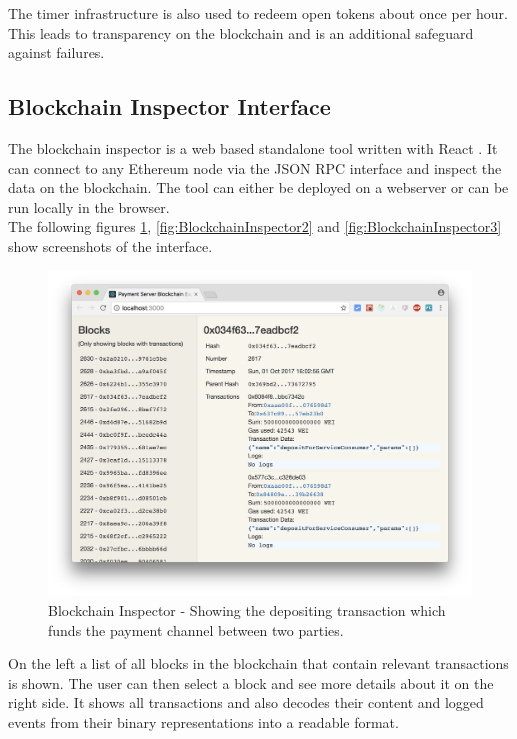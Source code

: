 \documentclass[a4paper,12pt]{scrartcl}
\begin{document}
The timer infrastructure is also used to redeem open tokens about once per hour. This leads to transparency on the blockchain and is an additional safeguard against failures.

\subsection{Blockchain Inspector Interface}

The blockchain inspector is a web based standalone tool written with React \cite{web36}. It can connect to any Ethereum node via the JSON RPC interface \cite{web23} and inspect the data on the blockchain. The tool can either be deployed on a webserver or can be run locally in the browser.\\
The following figures \ref{fig:BlockchainInspector1}, \ref{fig:BlockchainInspector2} and \ref{fig:BlockchainInspector3} show screenshots of the interface.\\

\begin{figure}[H]
\centering
\includegraphics[width=450pt]{Images/Visualizer-Deposit.png}
\caption{Blockchain Inspector - Showing the depositing transaction which funds the payment channel between two parties.}
\label{fig:BlockchainInspector1}
\end{figure}

On the left a list of all blocks in the blockchain that contain relevant transactions is shown. The user can then select a block and see more details about it on the right side. It shows all transactions and also decodes their content and logged events from their binary representations into a readable format.\\
\end{document}
